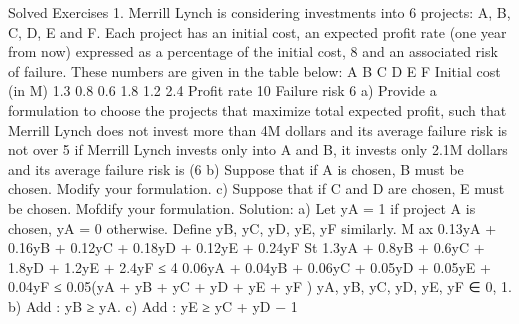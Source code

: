  Solved Exercises
1. Merrill Lynch is considering investments into 6 projects: A, B, C, D, E and F. Each project has an
initial cost, an expected profit rate (one year from now) expressed as a percentage of the initial cost,
8
and an associated risk of failure. These numbers are given in the table below:
A B C D E F
Initial cost (in M) 1.3 0.8 0.6 1.8 1.2 2.4
Profit rate 10%
Failure risk 6%
a) Provide a formulation to choose the projects that maximize total expected profit, such that Merrill
Lynch does not invest more than 4M dollars and its average failure risk is not over 5%
if Merrill Lynch invests only into A and B, it invests only 2.1M dollars and its average failure risk is
(6%
b) Suppose that if A is chosen, B must be chosen. Modify your formulation.
c) Suppose that if C and D are chosen, E must be chosen. Mofdify your formulation.
Solution: a) Let yA = 1 if project A is chosen, yA = 0 otherwise. Define yB, yC, yD, yE, yF similarly.
M ax 0.13yA + 0.16yB + 0.12yC + 0.18yD + 0.12yE + 0.24yF
St
1.3yA + 0.8yB + 0.6yC + 1.8yD + 1.2yE + 2.4yF ≤ 4
0.06yA + 0.04yB + 0.06yC + 0.05yD + 0.05yE + 0.04yF ≤ 0.05(yA + yB + yC + yD + yE + yF )
yA, yB, yC, yD, yE, yF ∈ {0, 1}.
b) Add : yB ≥ yA.
c) Add : yE ≥ yC + yD − 1
